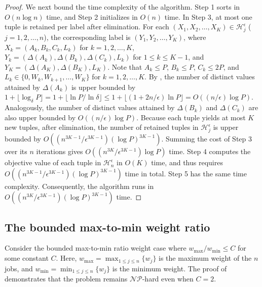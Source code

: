 \documentclass[12pt]{article} \textheight=24.5cm \textwidth=16.5cm \parskip = 0.165cm
\begin{document}
\begin{sloppypar}
\begin{proof}
            We next bound the time complexity of the algorithm.
            Step 1 sorts in $O(n\log n)$ time, and Step 2 initializes in $O(n)$ time.
            In Step 3, at most one tuple is retained per label after elimination.
            For each $(X_1, X_2, \ldots, X_K) \in \mathcal{H}_j^{\epsilon}$ ($j=1, 2, \ldots, n$), the corresponding label is  $(Y_1, Y_2, \ldots, Y_K)$, where $X_k=(A_k, B_k, C_k, L_k)$ for $k=1, 2, \ldots, K$, $Y_k=(\Delta(A_k), \Delta(B_k), \Delta(C_k), L_k)$ for $1 \leq k \leq K-1$, and $Y_K=(\Delta(A_K), \Delta(B_K), L_K)$.
            Note that $A_k \leq P$, $B_k \leq P$, $C_k \leq 2P$, and $L_k \in \{0, W_k, W_{k+1}, \ldots, W_K\}$ for $k=1, 2, \ldots, K$.
            By , the number of distinct values attained by $\Delta(A_k)$ is upper bounded by $1+\lfloor \log_{\delta} P \rfloor = 1+ \lfloor \ln P / \ln \delta \rfloor \leq 1+ \lfloor (1+2n/ \epsilon) \ln P \rfloor =O((n/ \epsilon) \log P)$.
            Analogously, the number of distinct values attained by $\Delta(B_k)$ and $\Delta(C_k)$ are also upper bounded by $O((n/\epsilon) \log P)$.
            Because each tuple yields at most $K$ new tuples, after elimination, the number of retained tuples in $\mathcal{H}_j^{\epsilon}$ is upper bounded by $O((n^{3K-1}/\epsilon^{3K-1}) (\log P)^{3K-1})$.
            Summing the cost of Step 3 over its $n$ iterations gives $O((n^{3K}/\epsilon^{3K-1}) \log P)$ time.
            Step 4 computes the objective value of each tuple in $\mathcal{H}_n^{\epsilon}$ in $O(K)$ time, and thus requires $O((n^{3K-1}/\epsilon^{3K-1}) (\log P)^{3K-1})$ time in total.
            Step 5 has the same time complexity.
            Consequently, the algorithm runs in $O((n^{3K}/\epsilon^{3K-1}) (\log P)^{3K-1})$ time.
        \end{proof}
        
        \subsection{The bounded max-to-min weight ratio} \label{sec:bounded_weight}
        
        Consider the bounded max-to-min ratio weight case where $w_{\max}/w_{\min} \leq C$ for some constant $C$.
        Here, $w_{\max}=\max_{1 \leq j \leq n} \{w_j\}$ is the maximum weight of the $n$ jobs, and $w_{\min}=\min_{1 \leq j \leq n} \{w_j\}$ is the minimum weight.
        The proof of  demonstrates that the problem remains $\mathcal{NP}$-hard even when $C=2$.
        

\end{sloppypar}
\end{document}
